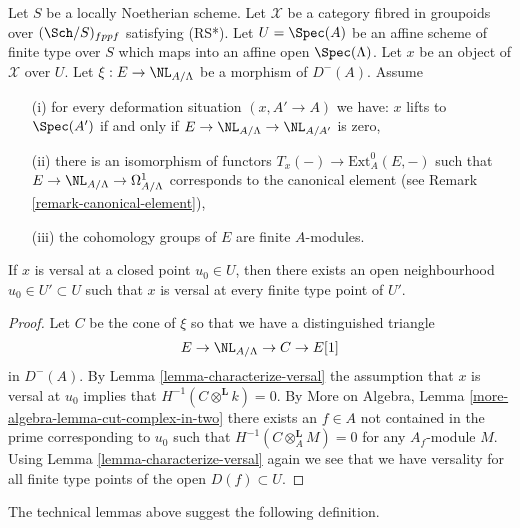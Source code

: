 \begin{lemma}
\label{lemma-openness}
Let $S$ be a locally Noetherian scheme. Let $\mathcal{X}$ be a category
fibred in groupoids over $(\Sch/S)_{fppf}$ satisfying (RS*).
Let $U = \Spec(A)$ be an affine scheme of finite type over $S$ which maps
into an affine open $\Spec(\Lambda)$. Let $x$ be an object of $\mathcal{X}$
over $U$. Let $\xi : E \to \NL_{A/\Lambda}$ be a morphism of $D^{-}(A)$.
Assume
\begin{enumerate}
\item[(i)] for every deformation situation $(x, A' \to A)$ we have:
$x$ lifts to $\Spec(A')$ if and only if
$E \to \NL_{A/\Lambda} \to \NL_{A/A'}$ is zero,
\item[(ii)] there is an isomorphism of functors
$T_x(-) \to \text{Ext}^0_A(E, -)$
such that $E \to \NL_{A/\Lambda} \to \Omega^1_{A/\Lambda}$
corresponds to the canonical element (see
Remark \ref{remark-canonical-element}),
\item[(iii)] the cohomology groups of $E$ are finite $A$-modules.
\end{enumerate}
If $x$ is versal at a closed point $u_0 \in U$,
then there exists an open neighbourhood $u_0 \in U' \subset U$
such that $x$ is versal at every finite type point of $U'$.
\end{lemma}

\begin{proof}
Let $C$ be the cone of $\xi$ so that we have a distinguished triangle
$$
E \to \NL_{A/\Lambda} \to C \to E[1]
$$
in $D^{-}(A)$. By Lemma \ref{lemma-characterize-versal}
the assumption that $x$ is versal at $u_0$ implies that
$H^{-1}(C \otimes^\mathbf{L} k) = 0$. By
More on Algebra, Lemma \ref{more-algebra-lemma-cut-complex-in-two}
there exists an $f \in A$ not contained in the prime corresponding to
$u_0$ such that $H^{-1}(C \otimes^\mathbf{L}_A M) = 0$ for
any $A_f$-module $M$. Using
Lemma \ref{lemma-characterize-versal}
again we see that we have versality for all finite type points of
the open $D(f) \subset U$.
\end{proof}

\noindent
The technical lemmas above suggest the following definition.

